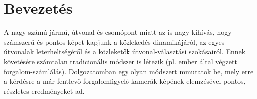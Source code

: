 \documentclass[12pt,a4paper]{article}
\begin{document}

\newpage

\tableofcontents

\newpage
\section{Bevezetés}
A nagy számú jármű, útvonal és csomópont miatt az is nagy kihívás, hogy számszerű és pontos képet kapjunk
a közlekedés dinamikájáról, az egyes útvonalak leterheltségéről és a közleketők útvonal-választási szokásairól.
Ennek követésére számtalan tradicionális módszer is létezik (pl. ember által végzett forgalom-számlálás).
Dolgozatomban egy olyan módszert mmutatok be, mely erre a kérdésre a már fentlevő forgalomfigyelő
kamerák képének elemzésével pontos, részletes eredményeket ad.
\end{document}
